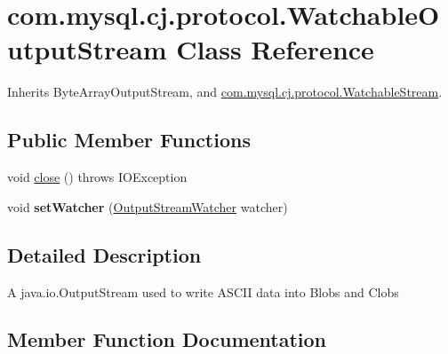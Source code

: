 \hypertarget{classcom_1_1mysql_1_1cj_1_1protocol_1_1_watchable_output_stream}{}\section{com.\+mysql.\+cj.\+protocol.\+Watchable\+Output\+Stream Class Reference}
\label{classcom_1_1mysql_1_1cj_1_1protocol_1_1_watchable_output_stream}


Inherits Byte\+Array\+Output\+Stream, and \mbox{\hyperlink{interfacecom_1_1mysql_1_1cj_1_1protocol_1_1_watchable_stream}{com.\+mysql.\+cj.\+protocol.\+Watchable\+Stream}}.

\subsection*{Public Member Functions}
\begin{DoxyCompactItemize}
\item 
void \mbox{\hyperlink{classcom_1_1mysql_1_1cj_1_1protocol_1_1_watchable_output_stream_a66d41e9502d2e1a849b8574a1ef449e3}{close}} ()  throws I\+O\+Exception 
\item 
\mbox{\label{classcom_1_1mysql_1_1cj_1_1protocol_1_1_watchable_output_stream_a58495ba6a5906781f2dc6f0b861dd0b8}} 
void {\bfseries set\+Watcher} (\mbox{\hyperlink{interfacecom_1_1mysql_1_1cj_1_1protocol_1_1_output_stream_watcher}{Output\+Stream\+Watcher}} watcher)
\end{DoxyCompactItemize}


\subsection{Detailed Description}
A java.\+io.\+Output\+Stream used to write A\+S\+C\+II data into Blobs and Clobs 

\subsection{Member Function Documentation}
\mbox{\label{classcom_1_1mysql_1_1cj_1_1protocol_1_1_watchable_output_stream_a66d41e9502d2e1a849b8574a1ef449e3}} 
